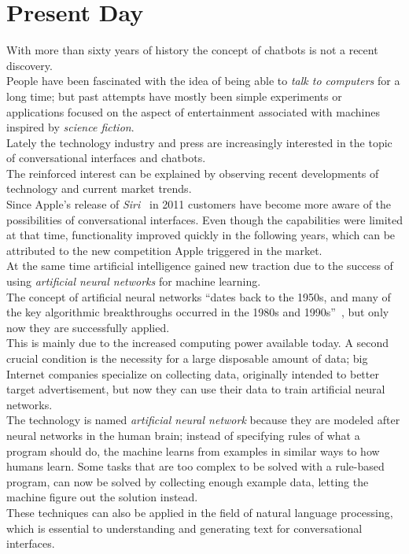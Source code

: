 \section{Present Day}
\label{presentday}


With more than sixty years of history the concept of chatbots is not a recent discovery.
\\
People have been fascinated with the idea of being able to \emph{talk to computers} for a long time;
but past attempts have mostly been simple experiments or applications focused on the aspect of entertainment associated with machines inspired by \emph{science fiction}.
\\

Lately the technology industry and press are increasingly interested in the topic of conversational interfaces and chatbots.
\\
The reinforced interest can be explained by observing recent developments of technology and current market trends.
\\

Since Apple's release of \emph{Siri}~\cite{iphonelaunch} in 2011 customers have become more aware of the possibilities of conversational interfaces.
Even though the capabilities were limited at that time,
functionality improved quickly in the following years,
which can be attributed to the new competition Apple triggered in the market.
\\

At the same time artificial intelligence gained new traction due to the success of using \emph{artificial neural networks} for machine learning.
\\

The concept of artificial neural networks ``dates back to the 1950s, and many of the key algorithmic breakthroughs occurred in the 1980s and 1990s''~\cite{airevolution},
but only now they are successfully applied.
\\
This is mainly due to the increased computing power available today.
A second crucial condition is the necessity for a large disposable amount of data;
big Internet companies specialize on collecting data, originally intended to better target advertisement,
but now they can use their data to train artificial neural networks.
\\
The technology is named \emph{artificial neural network} because they are modeled after neural networks in the human brain;
instead of specifying rules of what a program should do, the machine learns from examples in similar ways to how humans learn.
Some tasks that are too complex to be solved with a rule-based program, can now be solved by collecting enough example data,
letting the machine figure out the solution instead.
\\
These techniques can also be applied in the field of natural language processing,
which is essential to understanding and generating text for conversational interfaces.
\\

